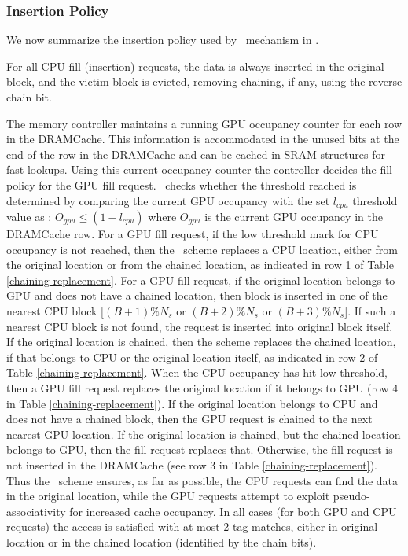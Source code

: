 \subsubsection{Insertion Policy}
\par We now summarize the insertion policy used by \chaining\ mechanism in \cachename. 
\par For all CPU fill (insertion) requests, the data is always inserted in the original block, and the victim block is evicted, removing chaining, if any, using the reverse chain bit. 
\par The memory controller maintains a running GPU occupancy counter for each row in the DRAMCache. This information is accommodated in the unused bits at the end of the row in the DRAMCache and can be cached in SRAM structures for fast lookups. Using this current occupancy counter the controller decides the fill policy for the GPU fill request. \cachename\ checks whether the threshold reached is determined by comparing the current GPU occupancy with the set \textit{$l_{cpu}$} threshold value as : $O_{gpu}\le(1-l_{cpu})$ where $O_{gpu}$ is the current GPU occupancy in the DRAMCache row. For a GPU fill request, if the low threshold mark for CPU occupancy is not reached, then the \chaining\ scheme replaces a CPU location, either from the original location or from the chained location, as indicated in row 1 of Table \ref{chaining-replacement}. For a GPU fill request, if the original location belongs to GPU and does not have a chained location, then block is inserted in one of the nearest CPU block [$(B+1)\%N_s$ or $(B+2)\%N_s$ or $(B+3)\%N_s$]. If such a nearest CPU block is not found, the request is inserted into original block itself. If the original location is chained, then the scheme replaces the chained location, if that belongs to CPU or the original location itself, as indicated in row 2 of Table \ref{chaining-replacement}. When the CPU occupancy has hit low threshold, then a GPU fill request replaces the original location if it belongs to GPU (row 4 in Table \ref{chaining-replacement}). If the original location belongs to CPU and does not have a chained block, then the GPU request is chained to the next nearest GPU location. If the original location is chained, but the chained location belongs to GPU, then the fill request replaces that. Otherwise, the fill request is not inserted in the DRAMCache (see row 3 in Table \ref{chaining-replacement}). Thus the \chaining\ scheme ensures, as far as possible, the CPU requests can find the data in the original location, while the GPU requests attempt to exploit pseudo-associativity for increased cache occupancy. In all cases (for both GPU and CPU requests) the access is satisfied with at most 2 tag matches, either in original location or in the chained location (identified by the chain bits). 

